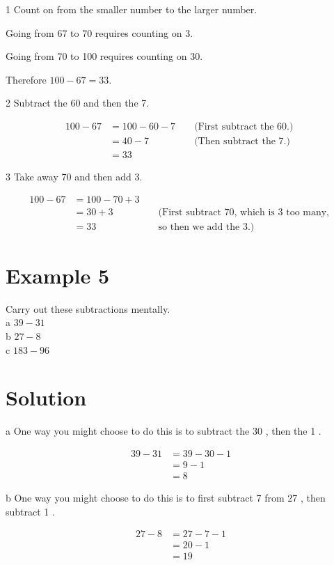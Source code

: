\documentclass[10pt]{article}
\begin{document}
1 Count on from the smaller number to the larger number.

Going from 67 to 70 requires counting on 3.

Going from 70 to 100 requires counting on 30.

Therefore \(100-67=33\).

2 Subtract the 60 and then the 7.

\[
\begin{aligned}
100-67 & =100-60-7 & & \text { (First subtract the 60.) } \\
& =40-7 & & \text { (Then subtract the 7.) } \\
& =33 & &
\end{aligned}
\]

3 Take away 70 and then add 3.

\[
\begin{aligned}
100-67 & =100-70+3 & & \\
& =30+3 & & \text { (First subtract 70, which is } 3 \text { too many, } \\
& =33 & & \text { so then we add the 3.) }
\end{aligned}
\]

\section*{Example 5}
Carry out these subtractions mentally.\\
a \(39-31\)\\
b \(27-8\)\\
c \(183-96\)

\section*{Solution}
a One way you might choose to do this is to subtract the 30 , then the 1 .

\[
\begin{aligned}
39-31 & =39-30-1 \\
& =9-1 \\
& =8
\end{aligned}
\]

b One way you might choose to do this is to first subtract 7 from 27 , then subtract 1 .

\[
\begin{aligned}
27-8 & =27-7-1 \\
& =20-1 \\
& =19
\end{aligned}
\]
\end{document}
